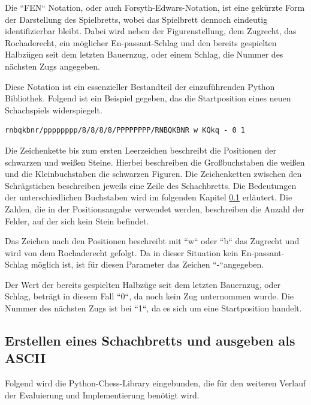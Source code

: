 Die ``FEN`` Notation, oder auch Forsyth-Edwars-Notation, ist eine gekürzte Form der Darstellung des Spielbretts, wobei das Spielbrett dennoch eindeutig identifizierbar bleibt. Dabei wird neben der Figurenstellung, dem Zugrecht, das Rochaderecht, ein möglicher En-passant-Schlag und den bereits gespielten Halbzügen seit dem letzten Bauernzug, oder einem Schlag, die Nummer des nächsten Zugs angegeben.\cite{FEN2019}

Diese Notation ist ein essenzieller Bestandteil der einzuführenden Python Bibliothek. Folgend ist ein Beispiel gegeben, das die Startposition eines neuen Schachspiels widerspiegelt.

\begin{Verbatim}[commandchars=\\\{\}]
rnbqkbnr/pppppppp/8/8/8/8/PPPPPPPP/RNBQKBNR w KQkq - 0 1
\end{Verbatim}

Die Zeichenkette bis zum ersten Leerzeichen beschreibt die Positionen der schwarzen und weißen Steine. Hierbei beschreiben die Großbuchstaben die weißen und die Kleinbuchstaben die schwarzen Figuren. Die Zeichenketten zwischen den Schrägstichen beschreiben jeweils eine Zeile des Schachbretts. Die Bedeutungen der unterschiedlichen Buchstaben wird im folgenden Kapitel \ref{erstellen-eines-schachbretts-und-ausgeben-als-ascii} erläutert. Die Zahlen, die in der Positionsangabe verwendet werden, beschreiben die Anzahl der Felder, auf der sich kein Stein befindet.

Das Zeichen nach den Positionen beschreibt mit ``w`` oder ``b`` das Zugrecht und wird von dem Rochaderecht gefolgt. Da in dieser Situation kein En-passant-Schlag möglich ist, ist für diesen Parameter das Zeichen ``-``angegeben.

Der Wert der bereits gespielten Halbzüge seit dem letzten Bauernzug, oder Schlag, beträgt in diesem Fall ``0``, da noch kein Zug unternommen wurde. Die Nummer des nächsten Zugs ist bei ``1``, da es sich um eine Startposition handelt.

    \subsection{Erstellen eines Schachbretts und ausgeben als
ASCII}\label{erstellen-eines-schachbretts-und-ausgeben-als-ascii}

Folgend wird die Python-Chess-Library eingebunden, die für den
weiteren Verlauf der Evaluierung und Implementierung benötigt wird.

